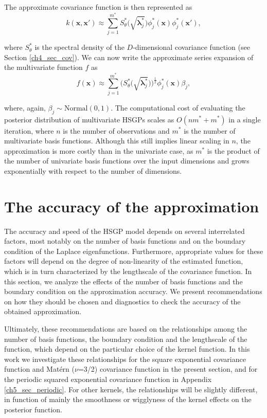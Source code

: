 \documentclass[onecolumn,a4paper,11pt]{article}
\begin{document}
\noindent The approximate covariance function is then represented as
%
\begin{equation}\label{eq_approxcov_multi}
k(\bm{x},\bm{x}') \approx \sum_{j=1}^{m^{\ast}} 
S^{\ast}_{\theta}\big(\sqrt{\bm{\lambda}^{\ast}_j}\big)
\phi^{\ast}_j(\bm{x}) \phi^{\ast}_j(\bm{x}'),
\end{equation}

\noindent where $S^{\ast}_{\theta}$ is the spectral density of the $D$-dimensional covariance function (see Section \ref{ch4_sec_cov}). We can now write the approximate series expansion of the multivariate function $f$ as
%
\begin{equation}\label{eq_approxf_multi}
f(\bm{x}) \approx \sum_{j=1}^{m^{\ast}} 
\big( S^{\ast}_{\theta} \big(\sqrt{\bm{\lambda}^{\ast}_j} \big)\big)^{\! \frac{1}{2}} \phi^{\ast}_j(\bm{x}) \beta_j, 
\end{equation}

\noindent where, again, $\beta_j \sim \text{Normal}(0,1)$. The computational cost of evaluating the posterior distribution  of multivariate HSGPs scales as $O(n m^{\ast} + m^{\ast})$ in a single iteration, where $n$ is the number of observations and $m^{\ast}$ is the number of multivariate basis functions. Although this still implies linear scaling in $n$, the approximation is more costly than in the univariate case, as $m^{\ast}$ is the product of the number of univariate basis functions over the input dimensions and grows exponentially with respect to the number of  dimensions.


\section{The accuracy of the approximation}\label{ch5_sec_accuracy}

The accuracy and speed of the HSGP model depends on several interrelated factors, most notably on the number of basis functions and on the boundary condition of the Laplace eigenfunctions. Furthermore, appropriate values for these factors will depend on the degree of non-linearity of the estimated function, which is in turn characterized by the lengthscale of the covariance function.
In this section, we analyze the effects of the number of basis functions and the boundary condition on the approximation accuracy. We present recommendations on how they should be chosen and diagnostics to check the accuracy of the obtained approximation. 

Ultimately, these recommendations are based on the relationships among the number of basis functions, the boundary condition and the lengthscale of the function, which depend on the particular choice of the kernel function. In this work we investigate these relationships for the square exponential covariance function and Mat{\'e}rn ($\nu$=3/2) covariance function in the present section, and for the periodic squared exponential covariance function in Appendix \ref{ch5_sec_periodic}. For other kernels, the relationships will be slightly different, in function of mainly the smoothness or wigglyness of the kernel effects on the posterior function.
\end{document}

